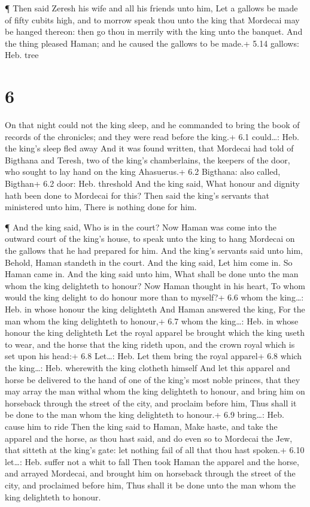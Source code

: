  ¶ Then said Zeresh his wife and all his friends unto him,
Let a gallows be made of fifty cubits high, and to morrow speak thou
unto the king that Mordecai may be hanged thereon: then go thou in
merrily with the king unto the banquet. And the thing pleased Haman; and
he caused the gallows to be made.+ 5.14 gallows: Heb. tree

\hypertarget{section-5}{%
\section{6}\label{section-5}}

 On that night could not the king sleep, and he commanded to
bring the book of records of the chronicles; and they were read before
the king.+ 6.1 could\ldots: Heb. the king's sleep fled away 
And it was found written, that Mordecai had told of Bigthana and Teresh,
two of the king's chamberlains, the keepers of the door, who sought to
lay hand on the king Ahasuerus.+ 6.2 Bigthana: also called, Bigthan+ 6.2
door: Heb. threshold  And the king said, What honour and
dignity hath been done to Mordecai for this? Then said the king's
servants that ministered unto him, There is nothing done for him.

 ¶ And the king said, Who is in the court? Now Haman was
come into the outward court of the king's house, to speak unto the king
to hang Mordecai on the gallows that he had prepared for him.
 And the king's servants said unto him, Behold, Haman
standeth in the court. And the king said, Let him come in. 
So Haman came in. And the king said unto him, What shall be done unto
the man whom the king delighteth to honour? Now Haman thought in his
heart, To whom would the king delight to do honour more than to myself?+
6.6 whom the king\ldots: Heb. in whose honour the king delighteth
 And Haman answered the king, For the man whom the king
delighteth to honour,+ 6.7 whom the king\ldots: Heb. in whose honour the
king delighteth  Let the royal apparel be brought which the
king useth to wear, and the horse that the king rideth upon, and the
crown royal which is set upon his head:+ 6.8 Let\ldots: Heb. Let them
bring the royal apparel+ 6.8 which the king\ldots: Heb. wherewith the
king clotheth himself  And let this apparel and horse be
delivered to the hand of one of the king's most noble princes, that they
may array the man withal whom the king delighteth to honour, and bring
him on horseback through the street of the city, and proclaim before
him, Thus shall it be done to the man whom the king delighteth to
honour.+ 6.9 bring\ldots: Heb. cause him to ride  Then the
king said to Haman, Make haste, and take the apparel and the horse, as
thou hast said, and do even so to Mordecai the Jew, that sitteth at the
king's gate: let nothing fail of all that thou hast spoken.+ 6.10
let\ldots: Heb. suffer not a whit to fall  Then took Haman
the apparel and the horse, and arrayed Mordecai, and brought him on
horseback through the street of the city, and proclaimed before him,
Thus shall it be done unto the man whom the king delighteth to honour.


